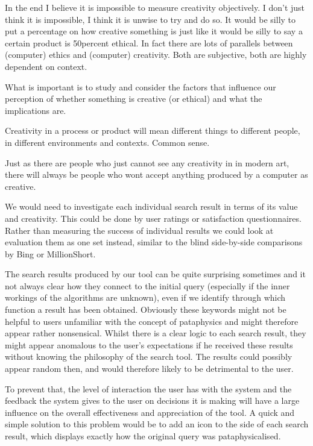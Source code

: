 \begin{draft}
  In the end I believe it is impossible to measure creativity objectively. I don’t just think it is impossible, I think it is unwise to try and do so. It would be silly to put a percentage on how creative something is just like it would be silly to say a certain product is 50percent ethical. In fact there are lots of parallels between (computer) ethics and (computer) creativity. Both are subjective, both are highly dependent on context.

  What is important is to study and consider the factors that influence our perception of whether something is creative (or ethical) and what the implications are.

  Creativity in a process or product will mean different things to different people, in different environments and contexts.
  Common sense.

  Just as there are people who just cannot see any creativity in in modern art, there will always be people who wont accept anything produced by a computer as creative.
\end{draft}%



We would need to investigate each individual search result in terms of its value and creativity. This could be done by user ratings or satisfaction questionnaires. Rather than measuring the success of individual results we could look at evaluation them as one set instead, similar to the blind side-by-side comparisons by Bing or MillionShort.

The search results produced by our tool can be quite surprising sometimes and it not always clear how they connect to the initial query (especially if the inner workings of the algorithms are unknown), even if we identify through which function a result has been obtained. Obviously these keywords might not be helpful to users unfamiliar with the concept of pataphysics and might therefore appear rather nonsensical. Whilst there is a clear logic to each search result, they might appear anomalous to the user’s expectations if he received these results without knowing the philosophy of the search tool. The results could possibly appear random then, and would therefore likely to be detrimental to the user.

To prevent that, the level of interaction the user has with the system and the feedback the system gives to the user on decisions it is making will have a large influence on the overall effectiveness and appreciation of the tool. A quick and simple solution to this problem would be to add an icon to the side of each search result, which displays exactly how the original query was pataphysicalised.


